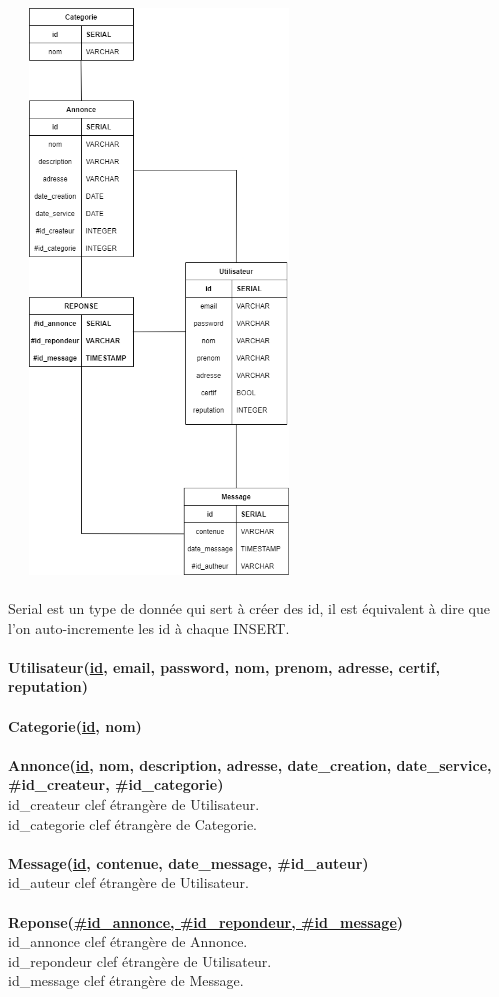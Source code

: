 \documentclass[a4paper,11pt]{article}
\begin{document}
\includegraphics[width=8cm, height=15cm]{images/Schema-relationnel-BDD.png}\\\\
Serial est un type de donnée qui sert à créer des id, il est équivalent à dire que l'on auto-incremente les id à chaque INSERT.\\\\
\textbf{Utilisateur(\underline{id}, email, password, nom, prenom, adresse, certif, reputation)}\\\\
\textbf{Categorie(\underline{id}, nom)}\\\\
\textbf{Annonce(\underline{id}, nom, description, adresse, date\_creation, date\_service, \#id\_createur, \#id\_categorie)}\\
id\_createur clef étrangère de Utilisateur.\\
id\_categorie clef étrangère de Categorie.\\\\
\textbf{Message(\underline{id}, contenue, date\_message, \#id\_auteur)}\\
id\_auteur clef étrangère de Utilisateur.\\\\
\textbf{Reponse(\underline{\#id\_annonce, \#id\_repondeur, \#id\_message})}\\
id\_annonce clef étrangère de Annonce.\\
id\_repondeur clef étrangère de Utilisateur.\\
id\_message clef étrangère de Message.\\\\
\end{document}
